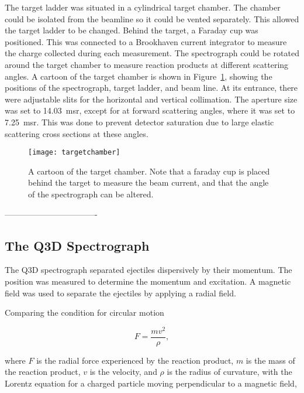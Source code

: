 The target ladder was situated in a cylindrical target chamber. The chamber could be isolated from the beamline so it could be vented separately. This allowed the target ladder to be changed. Behind the target, a Faraday cup was positioned. This was connected to a Brookhaven current integrator\cite{bic} to measure the charge collected during each measurement. The spectrograph could be rotated around the target chamber to measure reaction products at different scattering angles. A cartoon of the target chamber is shown in Figure~\ref{targetChamber}, showing the positions of the spectrograph, target ladder, and beam line. At its entrance, there were adjustable slits for the horizontal and vertical collimation. The aperture size was set to \SI{14.03}{\milli\steradian}, except for at forward scattering angles, where it was set to \SI{7.25}{\milli\steradian}. This was done to prevent detector saturation due to large elastic scattering cross sections at these angles.

\begin{figure}[h]	
\hspace*{-0.5cm}
\begin{center}	
	\texttt{[image: targetchamber]}
\end{center}
			\caption[Schematic of the Q3D target chamber]{A cartoon of the target chamber\cite{stuart}. Note that a faraday cup is placed behind the target to measure the beam current, and that the angle of the spectrograph can be altered.}
		\label{targetChamber}
\end{figure}
\FloatBarrier

 ----------------------------------

\subsection{The Q3D Spectrograph}

The Q3D spectrograph separated ejectiles dispersively by their momentum. The position was measured to determine the momentum and excitation. A magnetic field was used to separate the ejectiles by applying a radial field.

Comparing the condition for circular motion

\begin{equation}
	F = \frac{mv^2}{\rho}\mathrm{,}
\end{equation}

where $F$ is the radial force experienced by the reaction product, $m$ is the mass of the reaction product, $v$ is the velocity, and $\rho$ is the radius of curvature, with the Lorentz equation for a charged particle moving perpendicular to a magnetic field,

